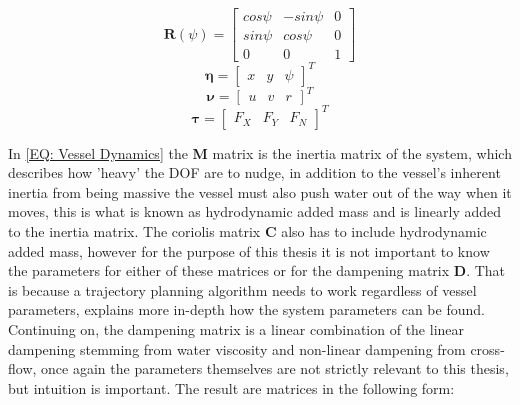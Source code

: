 \begin{equation}
    \textbf{R}(\psi) = \begin{bmatrix}
                        cos\psi &   -sin\psi & 0\\[-5pt]
                        sin\psi & cos\psi    & 0\\[-5pt]
                        0       &   0        & 1
                        \end{bmatrix}
\end{equation}
\begin{equation}
    \bm{\eta} = \begin{bmatrix}
                x   &    y  &    \psi
                \end{bmatrix}^T
\end{equation}
\begin{equation}
    \bm{\nu} = \begin{bmatrix}
                 u   &   v  &    r
                \end{bmatrix}^T
\end{equation}
\begin{equation}
    \bm{\tau} = \begin{bmatrix}
                F_{X}   &   F_{Y}  &   F_{N}
                \end{bmatrix}^T
\end{equation}

In \ref{EQ: Vessel Dynamics} the \textbf{M} matrix is the inertia matrix of the system, which describes how 'heavy' the \gls{DOF} are to nudge, in
addition to the vessel's inherent inertia from being massive the vessel must also push water out of the way when it moves, this is what is known as
hydrodynamic added mass and is linearly added to the inertia matrix. The coriolis matrix \textbf{C} also has to include hydrodynamic added mass,
however for the purpose of this thesis it is not important to know the parameters for either of these matrices or for the dampening matrix \textbf{D}.
That is because a trajectory planning algorithm needs to work regardless of vessel parameters, \cite{pedersen2019optimization} explains more in-depth
how the system parameters can be found. Continuing on, the dampening matrix is a linear combination of the linear dampening stemming from water
viscosity and non-linear dampening from cross-flow, once again the parameters themselves are not strictly relevant to this thesis, but intuition is
important. The result are matrices in the following form:

